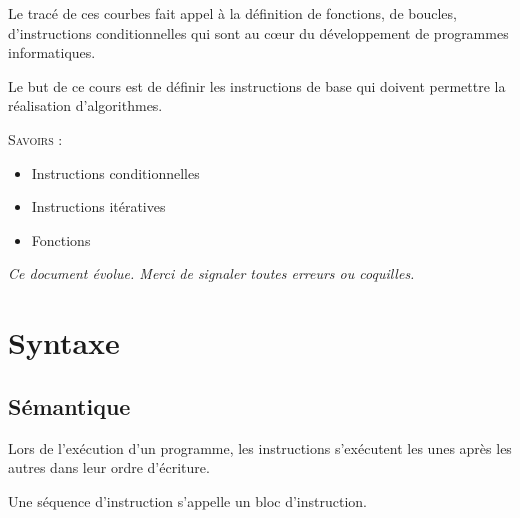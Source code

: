 \documentclass[11pt,oneside]{article}
\begin{document}




Le tracé de ces courbes fait appel à la définition de fonctions, de boucles, d'instructions conditionnelles qui sont au c\oe{}ur du développement de programmes informatiques. 

Le but de ce cours est de définir les instructions de base qui doivent permettre la réalisation d'algorithmes. 

\begin{savoir}
\textsc{Savoirs :}
\begin{itemize}
\item Instructions conditionnelles
\item Instructions itératives
\item Fonctions
\end{itemize}
\end{savoir}
 

\setlength{\parskip}{0ex plus 0.2ex minus 0ex}
 \renewcommand{\contentsname}{}
 \renewcommand{\baselinestretch}{1}

\tableofcontents

 \renewcommand{\baselinestretch}{1.2}
\setlength{\parskip}{2ex plus 0.5ex minus 0.2ex}

\textit{Ce document évolue. Merci de signaler toutes erreurs ou coquilles.}


\section{Syntaxe}

\subsection{Sémantique}
\begin{defi}
Lors de l'exécution d'un programme, les instructions s'exécutent les unes après les autres dans leur ordre d'écriture.

Une séquence d'instruction s'appelle un bloc d'instruction.
\end{defi}
\end{document}
